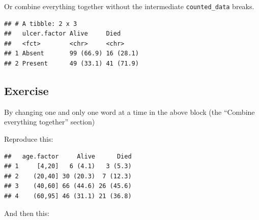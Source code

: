 \documentclass[]{book}
\makeatletter
\newenvironment{Shaded}{\begin{snugshade}}{\end{snugshade}}
\newcommand{\DataTypeTok}[1]{\textcolor[rgb]{0.13,0.29,0.53}{#1}}
\newcommand{\DecValTok}[1]{\textcolor[rgb]{0.00,0.00,0.81}{#1}}
\newcommand{\KeywordTok}[1]{\textcolor[rgb]{0.13,0.29,0.53}{\textbf{#1}}}
\newcommand{\NormalTok}[1]{#1}
\newcommand{\OperatorTok}[1]{\textcolor[rgb]{0.81,0.36,0.00}{\textbf{#1}}}
\newcommand{\StringTok}[1]{\textcolor[rgb]{0.31,0.60,0.02}{#1}}
\newenvironment{kframe}{%
\medskip{}
\setlength{\fboxsep}{.8em}
 \def\at@end@of@kframe{}%
 \ifinner\ifhmode%
  \def\at@end@of@kframe{\end{minipage}}%
  \begin{minipage}{\columnwidth}%
 \fi\fi%
 \def\FrameCommand##1{\hskip\@totalleftmargin \hskip-\fboxsep
 \colorbox{shadecolor}{##1}\hskip-\fboxsep
     \hskip-\linewidth \hskip-\@totalleftmargin \hskip\columnwidth}%
 \MakeFramed {\advance\hsize-\width
   \@totalleftmargin\z@ \linewidth\hsize
   \@setminipage}}%
 {\par\unskip\endMakeFramed%
 \at@end@of@kframe}
\renewenvironment{Shaded}{\begin{kframe}}{\end{kframe}}
\theoremstyle{definition}
\theoremstyle{definition}
\theoremstyle{definition}
\theoremstyle{remark}
\makeatother
\begin{document}
Or combine everything together without the intermediate
\texttt{counted\_data} breaks.

\begin{Shaded}
\end{Shaded}

\begin{verbatim}
## # A tibble: 2 x 3
##   ulcer.factor Alive     Died     
##   <fct>        <chr>     <chr>    
## 1 Absent       99 (66.9) 16 (28.1)
## 2 Present      49 (33.1) 41 (71.9)
\end{verbatim}

\hypertarget{exercise-36}{%
\subsection{Exercise}\label{exercise-36}}

By changing one and only one word at a time in the above block (the
``Combine everything together'' section)

Reproduce this:

\begin{verbatim}
##   age.factor     Alive      Died
## 1     [4,20]   6 (4.1)   3 (5.3)
## 2    (20,40] 30 (20.3)  7 (12.3)
## 3    (40,60] 66 (44.6) 26 (45.6)
## 4    (60,95] 46 (31.1) 21 (36.8)
\end{verbatim}

And then this:
\end{document}
